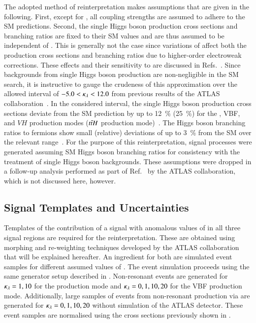 The adopted method of reinterpretation makes assumptions that are
given in the following. First, except for \klambda, all coupling
strengths are assumed to adhere to the SM predictions. Second, the
single Higgs boson production cross sections and branching ratios are
fixed to their SM values and are thus assumed to be independent of
\klambda. This is generally not the case since variations of \klambda
affect both the production cross sections and branching ratios due to
higher-order electroweak corrections. These effects and their
sensitivity to \klambda are discussed in
Refs.~\cite{ATL-PHYS-PUB-2019-009,Degrassi:2016wml,Maltoni:2017ims}.
Since backgrounds from single Higgs boson production are
non-negligible in the SM \HH search, it is instructive to gauge the
crudeness of this approximation over the allowed interval of
$-5.0 < \kappa_{\lambda} < 12.0$ from previous results of the ATLAS
collaboration~\cite{HDBS-2018-58}. In the considered \klambda
interval, the single Higgs boson production cross sections deviate
from the SM prediction by up to \SI{12}{\percent} (\SI{25}{\percent})
for the \ggF, VBF, and $VH$ production modes ($t\bar{t} H$ production
mode)~\cite{ATL-PHYS-PUB-2019-009}. The Higgs boson branching ratios
to fermions show small (relative) deviations of up to \SI{3}{\percent}
from the SM over the relevant \klambda
range~\cite{ATL-PHYS-PUB-2019-009}. For the purpose of this
reinterpretation, signal processes were generated assuming SM Higgs
boson branching ratios for consistency with the treatment of single
Higgs boson backgrounds. These assumptions were dropped in a follow-up
analysis performed as part of Ref.~\cite{ATL-HDBS-2022-03-002} by the
ATLAS collaboration, which is not discussed here, however.


\subsection{Signal Templates and Uncertainties}%
\label{sec:self_coupling_signals}

Templates of the contribution of a signal with anomalous values of
\klambda in all three signal regions are required for the
reinterpretation. These are obtained using morphing and re-weighting
techniques developed by the ATLAS collaboration that will be explained
hereafter. An ingredient for both are simulated event samples for
different assumed values of \klambda. The event simulation proceeds
using the same generator setup described in
. Non-resonant \HH events are generated
for $\kappa_{\lambda} = 1, 10$ for the \ggF production mode and
$\kappa_{\lambda} = 0, 1, 10, 20$ for the VBF production mode. Additionally,
large samples of events from non-resonant \HH production via \ggF are
generated for $\kappa_{\lambda} = 0, 1, 10, 20$ without simulation of the
ATLAS detector. These event samples are normalised using the cross
sections previously shown in .

